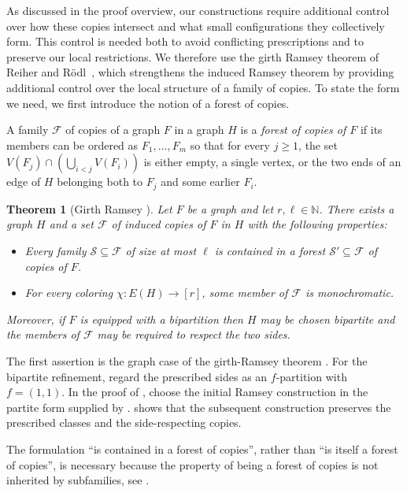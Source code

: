 \documentclass[11pt]{article}
\newtheorem{theorem}{Theorem}
\theoremstyle{remark}
\begin{document}
As discussed in the proof overview, our constructions require additional control over how these copies intersect and what small configurations they collectively form.
This control is needed both to avoid conflicting prescriptions and to preserve our local restrictions.
We therefore use the girth Ramsey theorem of Reiher and R\"odl~\cite{RR23}, which strengthens the induced Ramsey theorem by providing additional control over the local structure of a family of copies.
To state the form we need, we first introduce the notion of a forest of copies.

A family $\mathcal{F}$ of copies of a graph $F$ in a graph $H$ is a \emph{forest of copies of $F$} if its members can be ordered as $F_1, \ldots, F_m$ so that for every $j \geq 1$, the set $V(F_j) \cap \left(\bigcup_{i < j}V(F_i)\right)$ is either empty, a single vertex, or the two ends of an edge of $H$ belonging both to $F_j$ and some earlier $F_i$.

\begin{theorem}[Girth Ramsey {\cite{RR23}}]\label{thm:girth-ramsey}
    Let $F$ be a graph and let $r, \ell \in \mathbb{N}$.
    There exists a graph $H$ and a set $\mathcal{F}$ of induced copies of $F$ in $H$ with the following properties: \begin{itemize}
        \item Every family $\mathcal{S} \subseteq \mathcal{F}$ of size at most $\ell$ is contained in a forest $\mathcal{S'} \subseteq \mathcal{F}$ of copies of $F$.
        \item For every coloring $\chi : E(H) \to [r]$, some member of $\mathcal{F}$ is monochromatic.
    \end{itemize}
    Moreover, if $F$ is equipped with a bipartition then $H$ may be chosen bipartite and the members of $\mathcal{F}$ may be required to respect the two sides.
\end{theorem}

The first assertion is the graph case of the girth-Ramsey theorem \cite[Theorem 1.7]{RR23}. 
For the bipartite refinement, regard the prescribed sides as an $f$-partition with $f=(1,1)$.
In the proof of \cite[Theorem 13.12]{RR23}, choose the initial Ramsey construction in the partite form supplied by \cite[Proposition 3.8]{RR23}. 
\cite[Section 3.6]{RR23} shows that the subsequent construction preserves the prescribed classes and the side-respecting copies.

The formulation “is contained in a forest of copies”, rather than “is itself a forest of copies”, is necessary because the property of being a forest of copies is not inherited by subfamilies, see \cite{RR23}.
\end{document}

